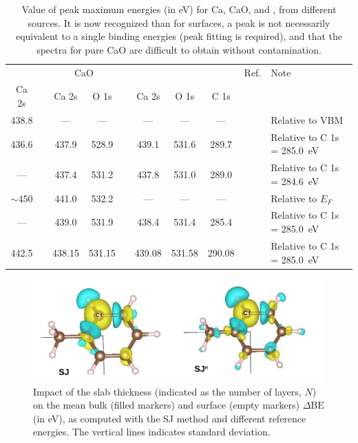 \documentclass[%
aip,
amsmath,amssymb,
preprint,%
]{revtex4-2}
\def\dbe{\ensuremath{\Delta\text{BE}}}
\begin{document}
\begin{table}[!h]
	\caption{Value of peak maximum energies  (in \si{\electronvolt}) for Ca, CaO, and  , from different sources. It is now recognized than for surfaces, a peak is not necessarily equivalent to a single binding energies (peak fitting is required), and that the spectra for pure CaO are difficult to obtain without contamination.\cite{dupinSystematicXPSStudies2000}}
	\begin{ruledtabular}
	\begin{tabular}{c ccc c ccc cl}
		\ce{Ca^0} & & \multicolumn{2}{c}{CaO} & & \multicolumn{3}{c}{\ce{CaCO3}} & Ref. & Note\\
		\cline{1-1} \cline{3-4} \cline{6-8}
		Ca 2s & & Ca 2s & O 1s  & & Ca 2s & O 1s & C 1s\\
		\hline
		438.8 & &---&---&& --- & --- &--- & \citenum{fuggleCorelevelBindingEnergies1980} & Relative to VBM\\
		436.6 & & 437.9 & 528.9& & 439.1 &531.6 & 289.7& \citenum{sosulnikovXrayPhotoelectronStudies1992}& Relative to C 1s = \SI{285.0}{\electronvolt}\\
		 --- && 437.4 & 531.2&& 437.8 & 531.0 & 289.0 & \citenum{demriXPSStudyCalcium1995} & Relative to C 1s = \SI{284.6}{\electronvolt}\\
		 $\sim$450 & & 441.0 & 532.2 & & --- & --- & --- & \citenum{ochsCO2ChemisorptionCa1998} & Relative to $E_F$ \\
		 --- & & 439.0 & 531.9 & & 438.4 & 531.4 & 285.4 & \citenum{cristHandbookMonochromaticXPS2000a} & Relative to C 1s = \SI{285.0}{\electronvolt}\\
		 442.5 & & 438.15 & 531.15 & & 439.08 & 531.58 & 290.08 & \citenum{cristXPSLibraryWebsite2021a} & Relative to C 1s = \SI{285.0}{\electronvolt}\\
		
	\end{tabular}
\end{ruledtabular}
\end{table}

\begin{figure}[!h]
\centering
\includegraphics[width=\linewidth]{FigureS3}
\caption{Impact of the slab thickness (indicated as the number of layers, $N$) on the mean bulk (filled markers)  and surface (empty markers) \dbe{} (in \si{\electronvolt}), as computed with the SJ method and different reference energies. The vertical lines indicates standard deviation.}
\label{fig:slabsthicknessSJ}
\end{figure}
\end{document}
